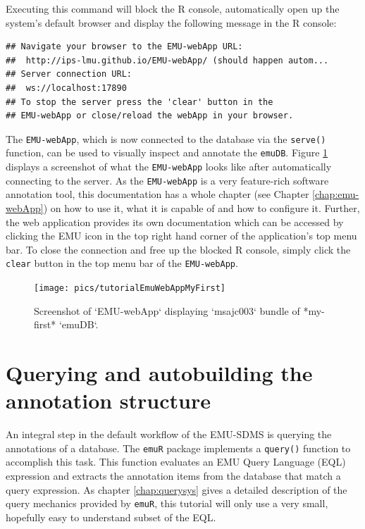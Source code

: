 \documentclass[]{book}
\begin{document}
Executing this command will block the R console, automatically open up the system's default browser and display the following message in the R console:

\begin{verbatim}
## Navigate your browser to the EMU-webApp URL: 
##  http://ips-lmu.github.io/EMU-webApp/ (should happen autom...
## Server connection URL:
##  ws://localhost:17890
## To stop the server press the 'clear' button in the 
## EMU-webApp or close/reload the webApp in your browser.
\end{verbatim}

The \texttt{EMU-webApp}, which is now connected to the database via the \texttt{serve()} function, can be used to visually inspect and annotate the \texttt{emuDB}. Figure \ref{fig:tutorial-emuWebAppMyFirst} displays a screenshot of what the \texttt{EMU-webApp} looks like after automatically connecting to the server. As the \texttt{EMU-webApp} is a very feature-rich software annotation tool, this documentation has a whole chapter (see Chapter \ref{chap:emu-webApp}) on how to use it, what it is capable of and how to configure it. Further, the web application provides its own documentation which can be accessed by clicking the EMU icon in the top right hand corner of the application's top menu bar. To close the connection and free up the blocked R console, simply click the \texttt{clear} button in the top menu bar of the \texttt{EMU-webApp}.

\begin{figure}

{\centering \texttt{[image: pics/tutorialEmuWebAppMyFirst]} 

}

\caption{Screenshot of `EMU-webApp` displaying `msajc003` bundle of *my-first* `emuDB`.}\label{fig:tutorial-emuWebAppMyFirst}
\end{figure}

\hypertarget{querying-and-autobuilding-the-annotation-structure}{%
\section{Querying and autobuilding the annotation structure}\label{querying-and-autobuilding-the-annotation-structure}}

An integral step in the default workflow of the EMU-SDMS is querying the annotations of a database. The \texttt{emuR} package implements a \texttt{query()} function to accomplish this task. This function evaluates an EMU Query Language (EQL) expression and extracts the annotation items from the database that match a query expression. As chapter \ref{chap:querysys} gives a detailed description of the query mechanics provided by \texttt{emuR}, this tutorial will only use a very small, hopefully easy to understand subset of the EQL.
\end{document}
